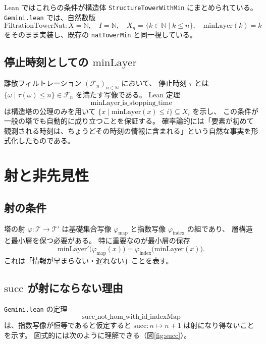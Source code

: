 \documentclass[a4paper,11pt]{ltjsarticle}
\begin{document}
Lean ではこれらの条件が構造体 \verb|StructureTowerWithMin| にまとめられている。
\texttt{Gemini.lean} では、自然数版
\[
  \mathrm{FiltrationTowerNat} : X = \mathbb{N},\quad I = \mathbb{N},\quad
  X_n = \{k\in\mathbb{N} \mid k\leq n\},\quad
  \mathrm{minLayer}(k)=k
\]
をそのまま実装し、既存の \verb|natTowerMin| と同一視している。

\subsection{停止時刻としての \texorpdfstring{\(\mathrm{minLayer}\)}{minLayer}}

離散フィルトレーション \((\mathcal{F}_n)_{n\in\mathbb{N}}\) において、
停止時刻 \(\tau\) とは \(\{\omega \mid \tau(\omega)\leq n\}\in\mathcal{F}_n\) を満たす写像である。
Lean 定理
\[
  \mathrm{minLayer\_is\_stopping\_time}
\]
は構造塔の公理のみを用いて
\(\{x \mid \mathrm{minLayer}(x)\leq i\}\subseteq X_i\) を示し、
この条件が一般の塔でも自動的に成り立つことを保証する。
確率論的には「要素が初めて観測される時刻は、ちょうどその時刻の情報に含まれる」という自然な事実を形式化したものである。

\section{射と非先見性}

\subsection{射の条件}

塔の射 \(\varphi : \mathcal{T}\to\mathcal{T}'\) は基礎集合写像
\(\varphi_{\mathrm{map}}\) と指数写像 \(\varphi_{\mathrm{index}}\) の組であり、
層構造と最小層を保つ必要がある。
特に重要なのが最小層の保存
\[
  \mathrm{minLayer}'\bigl(\varphi_{\mathrm{map}}(x)\bigr)
    = \varphi_{\mathrm{index}}\bigl(\mathrm{minLayer}(x)\bigr).
\]
これは「情報が早まらない・遅れない」ことを表す。

\subsection{\texorpdfstring{\(\mathrm{succ}\)}{succ} が射にならない理由}

\texttt{Gemini.lean} の定理
\[
  \mathrm{succ\_not\_hom\_with\_id\_indexMap}
\]
は、指数写像が恒等であると仮定すると \(\mathrm{succ}\colon n\mapsto n+1\) は射になり得ないことを示す。
図式的には次のように理解できる（図\ref{fig:succ}）。
\end{document}
